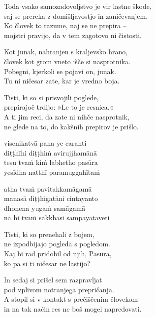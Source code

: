 Toda vsako samozadovoljstvo je vir lastne škode,\\
saj se prereka z domišljavostjo in zaničevanjem.\\
Ko človek to razume, naj se ne prepira --\\
mojstri pravijo, da v tem zagotovo ni čistosti.

Kot junak, nahranjen s kraljevsko hrano,\\
človek kot grom vneto išče si nasprotnika.\\
Pobegni, kjerkoli se pojavi on, junak.\\
Tu ni ničesar zate, kar je vredno boja.

Tisti, ki so si prisvojili poglede,\\
prepirajoč trdijo: »Le to je resnica.«\\
A ti jim reci, da zate ni nihče nasprotnik,\\
ne glede na to, do kakšnih prepirov je prišlo.


\clearpage

visenikatvā pana ye caranti\\
diṭṭhīhi diṭṭhiṁ avirujjhamānā\\
tesu tvaṁ kiṁ labhetho pasūra\\
yesīdha natthī paramuggahītaṁ

atha tvaṁ pavitakkamāgamā\\
manasā diṭṭhigatāni cintayanto\\
dhonena yugaṁ samāgamā\\
na hi tvaṁ sakkhasi sampayātaveti


\clearpage

Tisti, ki so prenehali z bojem,\\
ne izpodbijajo pogleda s pogledom.\\
Kaj bi rad pridobil od njih, Pasūra,\\
ko pa si ti ničesar ne lastijo?

In sedaj si prišel sem razpravljat\\
pod vplivom notranjega prepričanja.\\
A stopil si v kontakt s prečiščenim človekom\\
in na tak način res ne boš mogel napredovati.

